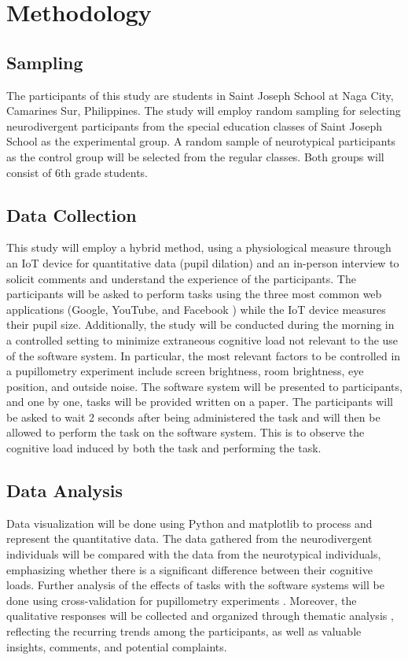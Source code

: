 \chapter{Methodology}

\section{Sampling}
The participants of this study are students in Saint Joseph School at Naga City, Camarines Sur, Philippines. The study will employ random sampling for selecting neurodivergent participants from the special education classes of Saint Joseph School as the experimental group. A random sample of neurotypical participants as the control group will be selected from the regular classes. Both groups will consist of 6th grade students.

\section{Data Collection}
This study will employ a hybrid method, using a physiological measure through an IoT device for quantitative data (pupil dilation) and an in-person interview to solicit comments and understand the experience of the participants. The participants will be asked to perform tasks using the three most common web applications (Google, YouTube, and Facebook \cite{kemp2025}) while the IoT device measures their pupil size. Additionally, the study will be conducted during the morning in a controlled setting to minimize extraneous cognitive load not relevant to the use of the software system. In particular, the most relevant factors to be controlled in a pupillometry experiment include screen brightness, room brightness, eye position, and outside noise. The software system will be presented to participants, and one by one, tasks will be provided written on a paper. The participants will be asked to wait 2 seconds after being administered the task and will then be allowed to perform the task on the software system. This is to observe the cognitive load induced by both the task and performing the task. 

\section{Data Analysis}
Data visualization will be done using Python and matplotlib to process and represent the quantitative data. The data gathered from the neurodivergent individuals will be compared with the data from the neurotypical individuals, emphasizing whether there is a significant difference between their cognitive loads. Further analysis of the effects of tasks with the software systems will be done using cross-validation for pupillometry experiments \cite{mathot2022}. Moreover, the qualitative responses will be collected and organized through thematic analysis \cite{rosala2022, bowman2023}, reflecting the recurring trends among the participants, as well as valuable insights, comments, and potential complaints.

